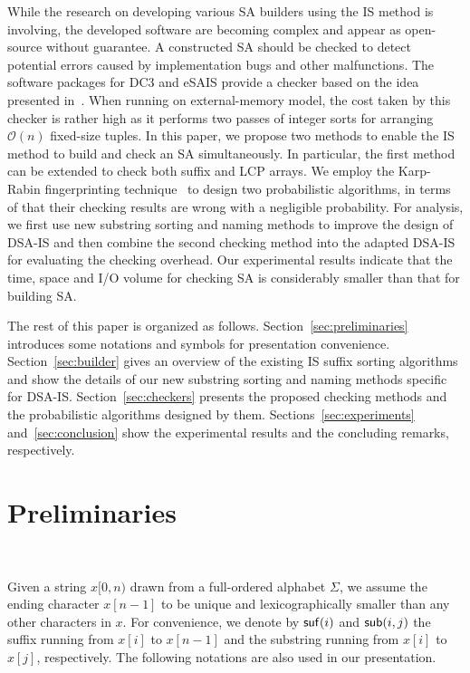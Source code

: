 \documentclass[10pt,journal,compsoc]{IEEEtran}
\begin{document}
While the research on developing various SA builders using the IS method is involving, the developed software are becoming complex and appear as open-source without guarantee. A constructed SA should be checked to detect potential errors caused by implementation bugs and other malfunctions. The software packages for DC3 and eSAIS provide a checker based on the idea presented in~\cite{Dementiev2008a}. When running on external-memory model, the cost taken  by this checker is rather high as it performs two passes of integer sorts for arranging $\mathcal{O}(n)$ fixed-size tuples. In this paper, we propose two methods to enable the IS method to build and check an SA simultaneously. In particular, the first method can be extended to check both suffix and LCP arrays. We employ the Karp-Rabin fingerprinting technique~\cite{Karp1987} to design two probabilistic algorithms, in terms of that their checking results are wrong with a negligible probability. For analysis, we first use new substring sorting and naming methods to improve the design of DSA-IS and then combine the second checking method into the adapted DSA-IS for evaluating the checking overhead. Our experimental results indicate that the time, space and I/O volume for checking SA is considerably smaller than that for building SA.

The rest of this paper is organized as follows. Section~\ref{sec:preliminaries} introduces some notations and symbols for presentation convenience. Section~\ref{sec:builder} gives an overview of the existing IS suffix sorting algorithms and show the details of our new substring sorting and naming methods specific for DSA-IS. Section~\ref{sec:checkers} presents the proposed checking methods and the probabilistic algorithms designed by them. Sections~\ref{sec:experiments} and~\ref{sec:conclusion} show the experimental results and the concluding remarks, respectively.

\section{Preliminaries}~\label{sec:preliminaries}

Given a string $x[0,n)$ drawn from a full-ordered alphabet $\Sigma$, we assume the ending character $x[n - 1]$ to be unique and lexicographically smaller than any other characters in $x$. For convenience, we denote by ${\sf suf}(i)$ and ${\sf sub}(i, j)$ the suffix running from $x[i]$ to $x[n-  1]$ and the substring running from $x[i]$ to $x[j]$, respectively. The following notations are also used in our presentation.
\end{document}
